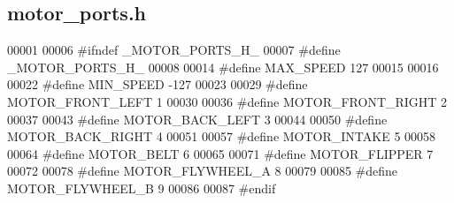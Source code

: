 \subsection{motor\+\_\+ports.\+h}
\label{motor__ports_8h_source}

\begin{DoxyCode}
00001 
00006 \textcolor{preprocessor}{#ifndef \_MOTOR\_PORTS\_H\_}
00007 \textcolor{preprocessor}{#define \_MOTOR\_PORTS\_H\_}
00008 
00014 \textcolor{preprocessor}{#define MAX\_SPEED 127}
00015 
00016 
00022 \textcolor{preprocessor}{#define MIN\_SPEED -127}
00023 
00029 \textcolor{preprocessor}{#define MOTOR\_FRONT\_LEFT 1}
00030 
00036 \textcolor{preprocessor}{#define MOTOR\_FRONT\_RIGHT 2}
00037 
00043 \textcolor{preprocessor}{#define MOTOR\_BACK\_LEFT 3}
00044 
00050 \textcolor{preprocessor}{#define MOTOR\_BACK\_RIGHT 4}
00051 
00057 \textcolor{preprocessor}{#define MOTOR\_INTAKE 5}
00058 
00064 \textcolor{preprocessor}{#define MOTOR\_BELT 6}
00065 
00071 \textcolor{preprocessor}{#define MOTOR\_FLIPPER 7}
00072 
00078 \textcolor{preprocessor}{#define MOTOR\_FLYWHEEL\_A 8}
00079 
00085 \textcolor{preprocessor}{#define MOTOR\_FLYWHEEL\_B 9}
00086 
00087 \textcolor{preprocessor}{#endif}
\end{DoxyCode}
